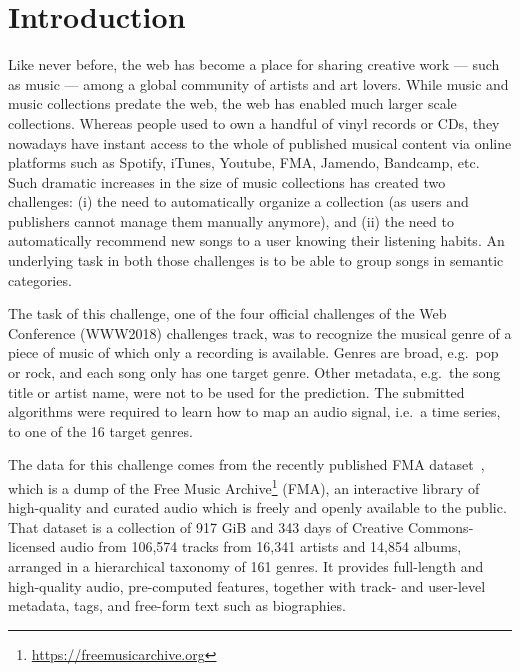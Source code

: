 \documentclass[sigconf]{acmart}
\begin{document}
\maketitle

\section{Introduction}

Like never before, the web has become a place for sharing creative work --- such as music --- among a global community of artists and art lovers. While music and music collections predate the web, the web has enabled much larger scale collections. Whereas people used to own a handful of vinyl records or CDs, they nowadays have instant access to the whole of published musical content via online platforms such as Spotify, iTunes, Youtube, FMA, Jamendo, Bandcamp, etc. Such dramatic increases in the size of music collections has created two challenges: (i) the need to automatically organize a collection (as users and publishers cannot manage them manually anymore), and (ii) the need to automatically recommend new songs to a user knowing their listening habits. An underlying task in both those challenges is to be able to group songs in semantic categories.

The task of this challenge, one of the four official challenges of the Web Conference (WWW2018) challenges track, was to recognize the musical genre of a piece of music of which only a recording is available. Genres are broad, e.g.\ pop or rock, and each song only has one target genre.
Other metadata, e.g.\ the song title or artist name, were not to be used for the prediction. The submitted algorithms were required to learn how to map an audio signal, i.e.\ a time series, to one of the 16 target genres.

The data for this challenge comes from the recently published FMA dataset~\cite{fma_dataset}, which is a dump of the Free Music Archive\footnote{\url{https://freemusicarchive.org}} (FMA), an interactive library of high-quality and curated audio which is freely and openly available to the public.
That dataset is a collection of 917 GiB and 343 days of Creative Commons-licensed audio from 106,574 tracks from 16,341 artists and 14,854 albums, arranged in a hierarchical taxonomy of 161 genres. It provides full-length and high-quality audio, pre-computed features, together with track- and user-level metadata, tags, and free-form text such as biographies.
\end{document}
